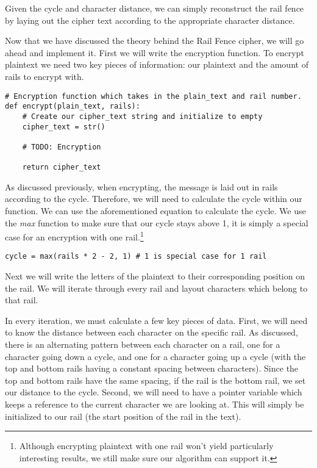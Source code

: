 Given the cycle and character distance, we can simply reconstruct the rail fence by laying out the cipher
text according to the appropriate character distance. 

Now that we have discussed the theory behind the Rail Fence cipher, we will go ahead and implement it.
First we will write the encryption function. To encrypt plaintext we need two key pieces of information:
our plaintext and the amount of rails to encrypt with. 

\begin{verbatim}
# Encryption function which takes in the plain_text and rail number.
def encrypt(plain_text, rails):
    # Create our cipher_text string and initialize to empty
    cipher_text = str()

    # TODO: Encryption

    return cipher_text
\end{verbatim}

As discussed previously, when encrypting, the message is laid out in rails according to the cycle. 
Therefore, we will need to calculate the cycle within our function. 
We can use the aforementioned equation to calculate the cycle. We use the \textit{max} function to 
make sure that our cycle stays above 1, it is simply a special case for an encryption with one rail.\footnote{Although 
encrypting plaintext with one rail won't yield particularly interesting results, we still make sure our algorithm can support it.}

\begin{verbatim}
cycle = max(rails * 2 - 2, 1) # 1 is special case for 1 rail    
\end{verbatim}

Next we will write the letters of the plaintext to their corresponding position on the rail. 
We will iterate through every rail and layout characters which belong to that rail. 

In every iteration, we must calculate a few key pieces of data. First, we will need to know the distance between 
each character on the specific rail. As discussed, there is an alternating pattern between each character on a rail,
one for a character going down a cycle, and one for a character going up a cycle (with the top and bottom rails
having a constant spacing between characters). Since the top and bottom rails have the same spacing, if the rail
is the bottom rail, we set our distance to the cycle. Second, we will need to have a pointer variable which
keeps a reference to the current character we are looking at. This will simply be initialized to our rail (the start position
of the rail in the text). 

